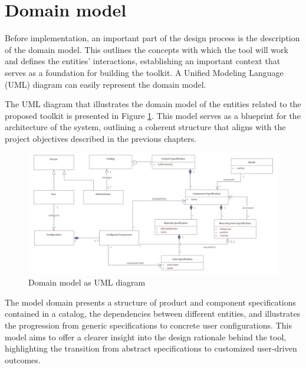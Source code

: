 \section{Domain model}

Before implementation, an important part of the design process is the description of the domain model. This outlines the concepts with which the tool will work and defines the entities' interactions, establishing an important context that serves as a foundation for building the toolkit. A Unified Modeling Language (UML) diagram can easily represent the domain model. \cite{Wlaschin2018}

The UML diagram that illustrates the domain model of the entities related to the proposed toolkit is presented in Figure \ref{fig:domain-model}. This model serves as a blueprint for the architecture of the system, outlining a coherent structure that aligns with the project objectives described in the previous chapters. 

\begin{landscape}
\begin{figure}[h]
\centering
\includegraphics[width=\linewidth]{images/uml_domainmodel.png}
\caption{Domain model as UML diagram}
\label{fig:domain-model}
\end{figure}
\end{landscape}

The model domain presents a structure of product and component specifications contained in a catalog, the dependencies between different entities, and illustrates the progression from generic specifications to concrete user configurations. This model aims to offer a clearer insight into the design rationale behind the tool, highlighting the transition from abstract specifications to customized user-driven outcomes.



